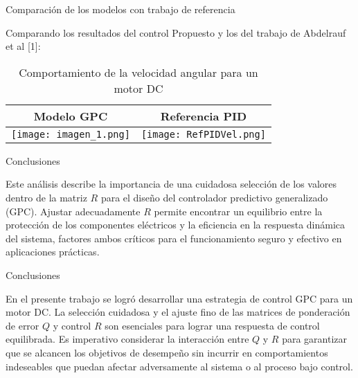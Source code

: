 \documentclass{beamer}
\begin{document}
\begin{frame}{Comparación de los modelos con trabajo de referencia}
\begin{justify}
\vspace{0.3cm}
\begin{itemize}  
Comparando los resultados del control Propuesto y los del trabajo de Abdelrauf et al [1]: 
\begin{table}[ht]
  \centering
  \begin{tabular}{|c|c|}
    \hline
    Modelo GPC & Referencia PID \\
    \hline
    \texttt{[image: imagen\_1.png]} & \texttt{[image: RefPIDVel.png]} \\
    \hline
  \end{tabular}
  \caption{Comportamiento de la velocidad angular para un motor DC}
  \label{tab:tabla_con_imagenes}
\end{table}
\end{itemize}
\end{justify}
\end{frame}

\begin{frame}{Conclusiones}
\begin{justify}
\vspace{0.3cm}
\begin{itemize}  
Este análisis describe la importancia de una cuidadosa selección de los valores dentro de la matriz \( R \) para el diseño del controlador predictivo generalizado (GPC). Ajustar adecuadamente \( R \) permite encontrar un equilibrio entre la protección de los componentes eléctricos y la eficiencia en la respuesta dinámica del sistema, factores ambos críticos para el funcionamiento seguro y efectivo en aplicaciones prácticas.
\end{itemize}
\end{justify}
\end{frame}

\begin{frame}{Conclusiones}
\begin{justify}
\vspace{0.3cm}
\begin{itemize}  
   En el presente trabajo se logró desarrollar una estrategia de control GPC para un motor DC. La selección cuidadosa y el ajuste fino de las matrices de ponderación de error \( Q \) y control \( R \) son esenciales para lograr una respuesta de control equilibrada. Es imperativo considerar la interacción entre \( Q \) y \( R \) para garantizar que se alcancen los objetivos de desempeño sin incurrir en comportamientos indeseables que puedan afectar adversamente al sistema o al proceso bajo control.
\end{itemize}
\end{justify}
\end{frame}
\end{document}

